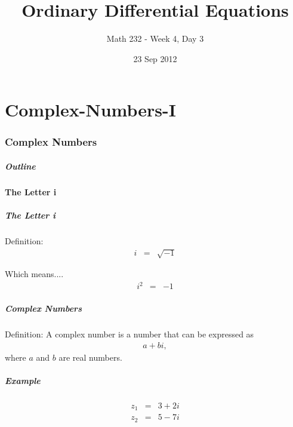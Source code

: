 \part{Complex-Numbers-I}
\section{Complex Numbers}

\title{Ordinary Differential Equations}
\subtitle{Math 232 - Week 4, Day 3}
\date{23 Sep 2012}

\begin{frame}
  \titlepage
\end{frame}

\begin{frame}
  \frametitle{Outline}
\end{frame}


\subsection{The Letter i}


\begin{frame}
  \frametitle{The Letter i}

  Definition: 
  \begin{eqnarray*}
    i & = & \sqrt{-1} 
  \end{eqnarray*}

  Which means....
  \begin{eqnarray*}
    i^2 & = & -1
  \end{eqnarray*}

\end{frame}


\begin{frame}
  \frametitle{Complex Numbers}

  Definition: A complex number is a  number that can be expressed as
  \begin{eqnarray*}
    a + bi,
  \end{eqnarray*}
  where $a$ and $b$ are real numbers.

\end{frame}



\begin{frame}
  \frametitle{Example}

  \begin{eqnarray*}
    z_1 & = & 3 + 2i \\
    z_2 & = & 5 - 7i
  \end{eqnarray*}

\end{frame}

